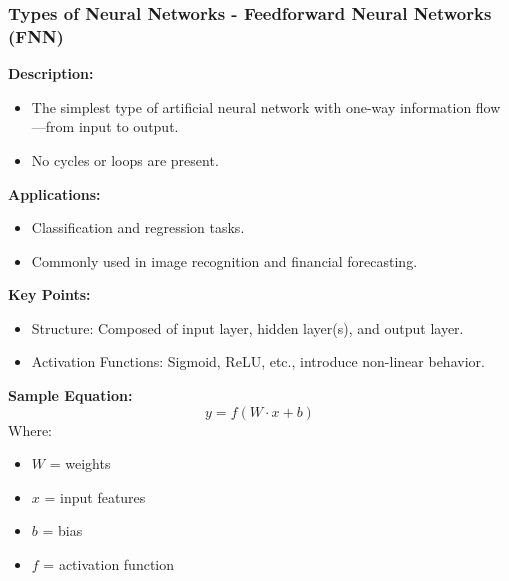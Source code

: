 \documentclass[aspectratio=169]{beamer}
\begin{document}
\begin{frame}[fragile]
    \frametitle{Types of Neural Networks - Feedforward Neural Networks (FNN)}
    \textbf{Description:}
    \begin{itemize}
        \item The simplest type of artificial neural network with one-way information flow—from input to output.
        \item No cycles or loops are present.
    \end{itemize}

    \textbf{Applications:}
    \begin{itemize}
        \item Classification and regression tasks.
        \item Commonly used in image recognition and financial forecasting.
    \end{itemize}

    \textbf{Key Points:}
    \begin{itemize}
        \item Structure: Composed of input layer, hidden layer(s), and output layer.
        \item Activation Functions: Sigmoid, ReLU, etc., introduce non-linear behavior.
    \end{itemize}

    \textbf{Sample Equation:}
    \begin{equation}
        y = f(W \cdot x + b)
    \end{equation}
    Where: 
    \begin{itemize}
        \item \( W \) = weights
        \item \( x \) = input features
        \item \( b \) = bias
        \item \( f \) = activation function
    \end{itemize}
\end{frame}
\end{document}
